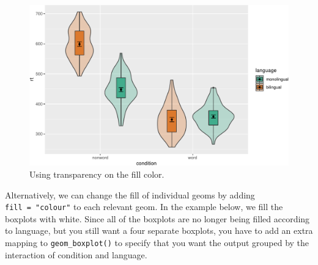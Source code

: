 \documentclass[
  english,
  doc,floatsintext]{apa6}
\begin{document}
\begin{figure}

{\centering \includegraphics[width=1\linewidth]{images/viobox6-1} 

}

\caption{Using transparency on the fill color.}\label{fig:viobox6}
\end{figure}

Alternatively, we can change the fill of individual geoms by adding \texttt{fill\ =\ "colour"} to each relevant geom. In the example below, we fill the boxplots with white. Since all of the boxplots are no longer being filled according to language, but you still want a four separate boxplots, you have to add an extra mapping to \texttt{geom\_boxplot()} to specify that you want the output grouped by the interaction of condition and language.
\end{document}
